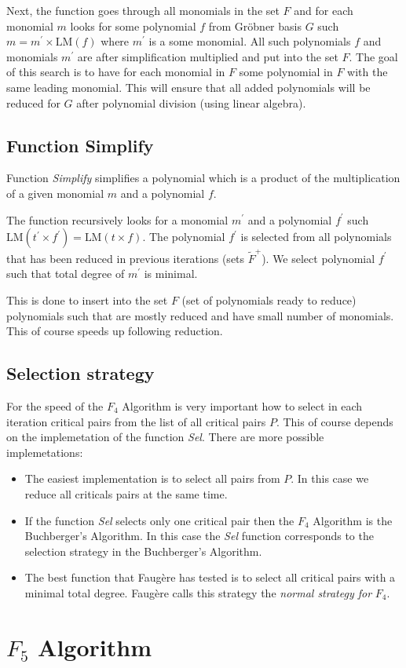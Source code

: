 Next, the function goes through all monomials in the set $F$ and for each monomial $m$ looks for some polynomial $f$ from Gr\"obner basis $G$ such $m = m^\prime \times \textrm{LM}(f)$ where $m^\prime$ is a some monomial. All such polynomials $f$ and monomials $m^\prime$ are after simplification multiplied and put into the set $F$. The goal of this search is to have for each monomial in $F$ some polynomial in $F$ with the same leading monomial. This will ensure that all added polynomials will be reduced for $G$ after polynomial division (using linear algebra).

\subsection{Function Simplify}
Function \textit{Simplify} simplifies a polynomial which is a product of the multiplication of a given monomial $m$ and a polynomial $f$.

The function recursively looks for a monomial $m^\prime$ and a polynomial $f^\prime$ such $\textrm{LM}(t^\prime\times f^\prime) = \textrm{LM}(t\times f)$. The polynomial $f^\prime$ is selected from all polynomials that has been reduced in previous iterations (sets $\tilde{F}^+$). We select polynomial $f^\prime$ such that total degree of $m^\prime$ is minimal.

This is done to insert into the set $F$ (set of polynomials ready to reduce) polynomials such that are mostly reduced and have small number of monomials. This of course speeds up following reduction.

\subsection{Selection strategy}
\label{subsec:F4:sel}
For the speed of the $F_4$ Algorithm is very important how to select in each iteration critical pairs from the list of all critical pairs $P$. This of course depends on the implemetation of the function \textit{Sel}. There are more possible implemetations:

\begin{itemize}
  \item The easiest implementation is to select all pairs from $P$. In this case we reduce all criticals pairs at the same time.
  \item If the function \textit{Sel} selects only one critical pair then the $F_4$ Algorithm is the Buchberger's Algorithm. In this case the \textit{Sel} function corresponds to the selection strategy in the Buchberger's Algorithm.
  \item The best function that Faug\`ere has tested is to select all critical pairs with a minimal total degree. Faug\`ere calls this strategy the \textit{normal strategy for} $F_4$.
\end{itemize}

\section{$F_5$ Algorithm}
